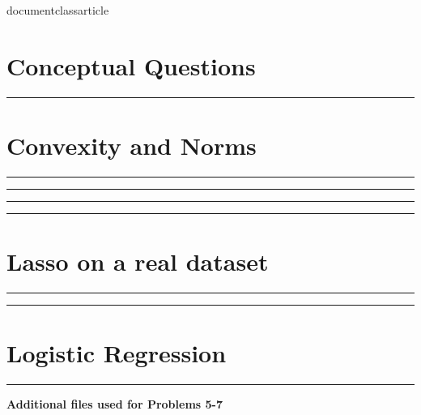 documentclass{article}





% 

\section*{Conceptual Questions}
\noindent\rule{\textwidth}{1pt}\vspace{0.75mm}


\section*{Convexity and Norms}
\noindent\rule{\textwidth}{1pt}\vspace{0.75mm}


\noindent\rule{\textwidth}{1pt}\vspace{0.75mm}


\noindent\rule{\textwidth}{1pt}\vspace{0.75mm}


\noindent\rule{\textwidth}{1pt}\vspace{0.75mm}


\section*{Lasso on a real dataset}
\noindent\rule{\textwidth}{1pt}\vspace{0.75mm}



\noindent\rule{\textwidth}{1pt}\vspace{0.75mm}



\section*{Logistic Regression}
\noindent\rule{\textwidth}{1pt}\vspace{0.75mm}



{\bf Additional files used for Problems 5-7}








